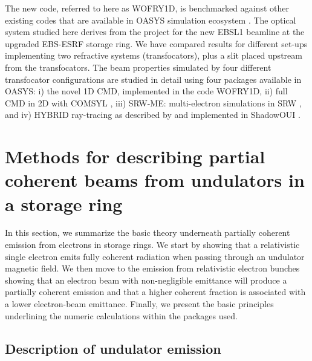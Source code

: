 \documentclass{iucr}
\begin{document}
The new code, referred to here as WOFRY1D, is benchmarked against other existing codes that are available in OASYS simulation ecosystem \cite{codeOASYS}. The optical system studied here derives from the project for the new EBSL1 beamline at the upgraded EBS-ESRF storage ring. We have compared results for different set-ups implementing two refractive systems (transfocators), plus a slit placed upstream from the transfocators. The beam properties simulated by four different transfocator configurations are studied in detail using four packages available in OASYS: i) the novel 1D CMD, implemented in the code WOFRY1D, ii) full CMD in 2D with COMSYL \cite{codeCOMSYL}, iii) SRW-ME: multi-electron simulations in SRW \cite{codeSRW}, and iv) HYBRID ray-tracing as described by  and implemented in ShadowOUI \cite{codeSHADOWOUI}.


\section{Methods for describing partial coherent beams from undulators in a storage ring}\label{sec:part_coh}

In this section, we summarize the basic theory underneath partially coherent emission from electrons in storage rings. We start by showing that a relativistic single electron emits fully coherent radiation when passing through an undulator magnetic field. We then move to the emission from relativistic electron bunches showing that an electron beam with non-negligible emittance will produce a partially coherent emission and that a higher coherent fraction is associated with a lower electron-beam emittance. Finally, we present the basic principles underlining the numeric calculations within the packages used.


\subsection{Description of undulator emission}
\label{sec:undulator}
\end{document}
